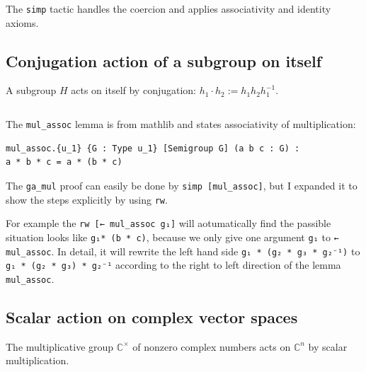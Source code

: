 \documentclass[
  12pt, %
]{assignment}
\newcommand{\leancodeurl}{}
\newcommand{\setleancodeurl}[1]{\renewcommand{\leancodeurl}{#1}}
\newcommand{\leancodefile}[3][]{%
  \setleancodeurl{#3}%
  \inputminted[fontsize=\footnotesize,breaklines,breakanywhere,tabsize=4,showspaces=false,linenos=true,#1]{lean4}{#2}%
}
\begin{document}
\leancodefile[firstline=55,lastline=64,firstnumber=55]{../lean/GroupAction/Examples.lean}{https://github.com/FrankieeW/GroupAction/blob/v1.0.0/lean/GroupAction/Examples.lean}

The \texttt{simp} tactic handles the coercion and applies associativity and identity axioms.

\subsection{Conjugation action of a subgroup on itself}
A subgroup $H$ acts on itself by conjugation: $h_1 \cdot h_2 := h_1 h_2 h_1^{-1}$.

\leancodefile[firstline=66,lastline=84,firstnumber=66]{../lean/GroupAction/Examples.lean}{https://github.com/FrankieeW/GroupAction/blob/v1.0.0/lean/GroupAction/Examples.lean}
The \texttt{mul\_assoc} lemma is from mathlib and states associativity of multiplication:

\begin{verbatim}
mul_assoc.{u_1} {G : Type u_1} [Semigroup G] (a b c : G) :
a * b * c = a * (b * c)
\end{verbatim}



The \texttt{ga\_mul} proof can easily be done by \texttt{simp [mul\_assoc]}, but I expanded it to show the steps explicitly by using \texttt{rw}.



For example the \texttt{rw [← mul\_assoc g₁]} will aotumatically find the passible situation looks like \texttt{g₁* (b * c)}, because we only give one argument \texttt{g₁} to \texttt{← mul\_assoc}.
In detail, it will rewrite the left hand side \texttt{g₁ * (g₂ * g₃ * g₂⁻¹)} to \texttt{g₁ * (g₂ * g₃) * g₂⁻¹} according to the right to left direction of the lemma \texttt{mul\_assoc}.
\subsection{Scalar action on complex vector spaces}
The multiplicative group $\mathbb{C}^\times$ of nonzero complex numbers acts on
$\mathbb{C}^n$ by scalar multiplication.

\leancodefile[firstline=88,lastline=98,firstnumber=88]{../lean/GroupAction/Examples.lean}{https://github.com/FrankieeW/GroupAction/blob/v1.0.0/lean/GroupAction/Examples.lean}
\end{document}
